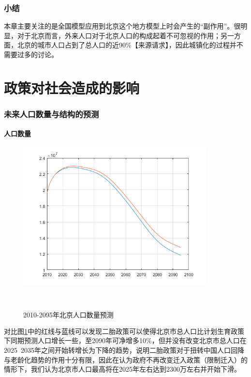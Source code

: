 \documentclass[a4paper]{article}
\begin{document}
\section{小结}
本章主要关注的是全国模型应用到北京这个地方模型上时会产生的“副作用”。很明显，对于北京而言，外来人口对于北京人口的构成起着不可忽视的作用；另一方面，北京的城市人口占到了总人口的近90\%【来源请求】，因此城镇化的过程并不需要过多的讨论。
	
\part{政策对社会造成的影响}
\section{未来人口数量与结构的预测}
\subsection{人口数量}
	\begin{figure}[htbp]
		\label{future_population_1}	
		\centering
		\includegraphics[width=10cm]{pics/future_population_1.png}
		\caption{2010-2095年北京人口数量预测}
		 \\
	\end{figure}
对比图\ref{future_population_1}中的红线与蓝线可以发现二胎政策可以使得北京市总人口比计划生育政策下同期预测人口增长一些，至2090年可净增多10\%，但并没有改变北京市总人口在2025~2035年之间开始转增长为下降的趋势，说明二胎政策对于扭转中国人口回降与老龄化趋势的作用十分有限，因此在认为政府不再改变迁入政策（限制迁入）的情形下，我们认为北京市人口最高将在2025年左右达到2300万左右并开始下滑。
\end{document}
